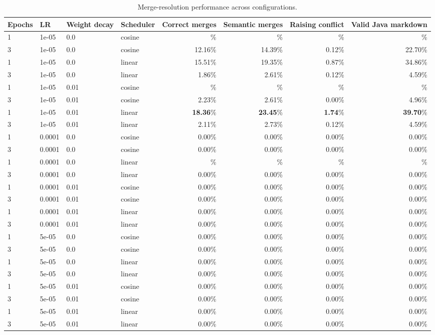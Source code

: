 \begin{table}[ht]
\centering
\begin{tabular}{l l l l r r r r}
\toprule
Epochs & LR & Weight decay & Scheduler & Correct merges & Semantic merges & Raising conflict & Valid Java markdown \\
\midrule
1 & 1e-05 & 0.0 & cosine & \% & \% & \% & \% \\
3 & 1e-05 & 0.0 & cosine & 12.16\% & 14.39\% & 0.12\% & 22.70\% \\
1 & 1e-05 & 0.0 & linear & 15.51\% & 19.35\% & 0.87\% & 34.86\% \\
3 & 1e-05 & 0.0 & linear & 1.86\% & 2.61\% & 0.12\% & 4.59\% \\
1 & 1e-05 & 0.01 & cosine & \% & \% & \% & \% \\
3 & 1e-05 & 0.01 & cosine & 2.23\% & 2.61\% & 0.00\% & 4.96\% \\
1 & 1e-05 & 0.01 & linear & \textbf{18.36}\% & \textbf{23.45}\% & \textbf{1.74}\% & \textbf{39.70}\% \\
3 & 1e-05 & 0.01 & linear & 2.11\% & 2.73\% & 0.12\% & 4.59\% \\
1 & 0.0001 & 0.0 & cosine & 0.00\% & 0.00\% & 0.00\% & 0.00\% \\
3 & 0.0001 & 0.0 & cosine & 0.00\% & 0.00\% & 0.00\% & 0.00\% \\
1 & 0.0001 & 0.0 & linear & \% & \% & \% & \% \\
3 & 0.0001 & 0.0 & linear & 0.00\% & 0.00\% & 0.00\% & 0.00\% \\
1 & 0.0001 & 0.01 & cosine & 0.00\% & 0.00\% & 0.00\% & 0.00\% \\
3 & 0.0001 & 0.01 & cosine & 0.00\% & 0.00\% & 0.00\% & 0.00\% \\
1 & 0.0001 & 0.01 & linear & 0.00\% & 0.00\% & 0.00\% & 0.00\% \\
3 & 0.0001 & 0.01 & linear & 0.00\% & 0.00\% & 0.00\% & 0.00\% \\
1 & 5e-05 & 0.0 & cosine & 0.00\% & 0.00\% & 0.00\% & 0.00\% \\
3 & 5e-05 & 0.0 & cosine & 0.00\% & 0.00\% & 0.00\% & 0.00\% \\
1 & 5e-05 & 0.0 & linear & 0.00\% & 0.00\% & 0.00\% & 0.00\% \\
3 & 5e-05 & 0.0 & linear & 0.00\% & 0.00\% & 0.00\% & 0.00\% \\
1 & 5e-05 & 0.01 & cosine & 0.00\% & 0.00\% & 0.00\% & 0.00\% \\
3 & 5e-05 & 0.01 & cosine & 0.00\% & 0.00\% & 0.00\% & 0.00\% \\
1 & 5e-05 & 0.01 & linear & 0.00\% & 0.00\% & 0.00\% & 0.00\% \\
3 & 5e-05 & 0.01 & linear & 0.00\% & 0.00\% & 0.00\% & 0.00\% \\
\bottomrule
\end{tabular}
\caption{Merge-resolution performance across configurations.}
\end{table}
